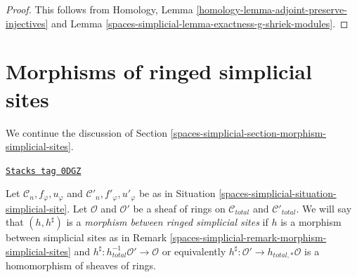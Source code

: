 \begin{proof}
This follows from
Homology, Lemma \ref{homology-lemma-adjoint-preserve-injectives}
and
Lemma \ref{spaces-simplicial-lemma-exactness-g-shriek-modules}.
\end{proof}

\section{Morphisms of ringed simplicial sites}
\label{spaces-simplicial-section-morphism-simplicial-sites-modules}
We continue the discussion of Section \ref{spaces-simplicial-section-morphism-simplicial-sites}.

\begin{remark}
\label{spaces-simplicial-remark-morphism-simplicial-sites-modules}
\href{https://stacks.math.columbia.edu/tag/0DGZ}{\texttt{Stacks tag 0DGZ}}

Let $\mathcal{C}_n, f_\varphi, u_\varphi$ and
$\mathcal{C}'_n, f'_\varphi, u'_\varphi$ be as in
Situation \ref{spaces-simplicial-situation-simplicial-site}.
Let $\mathcal{O}$ and $\mathcal{O}'$
be a sheaf of rings on $\mathcal{C}_{total}$ and $\mathcal{C}'_{total}$.
We will say that $(h, h^\sharp)$ is a
{\it morphism between ringed simplicial sites}
if $h$ is a morphism between simplicial sites as in
Remark \ref{spaces-simplicial-remark-morphism-simplicial-sites}
and $h^\sharp : h_{total}^{-1}\mathcal{O}' \to \mathcal{O}$
or equivalently $h^\sharp : \mathcal{O}' \to h_{total, *}\mathcal{O}$
is a homomorphism of sheaves of rings.
\end{remark}

